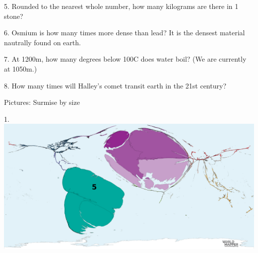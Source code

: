 \begin{frame}
\begin{center}
\Large
5. Rounded to the nearest whole number, how many kilograms are there in 1 stone?
\\
\end{center}
\end{frame}
\begin{frame}
\begin{center}
\Large
6. Osmium is how many times more dense than lead? It is the densest material nautrally found on earth.
\\
\end{center}
\end{frame}
\begin{frame}
\begin{center}
\Large
7. At 1200m, how many degrees below 100\textdegree C does water boil? (We are currently at 1050m.)
\\
\end{center}
\end{frame}
\begin{frame}
\begin{center}
\Large
8. How many times will Halley's comet transit earth in the 21st century?
\\
\end{center}
\end{frame}
\begin{frame}
\begin{center}
\Huge
Pictures: Surmise by size
\end{center}
\end{frame}
\begin{frame}
\begin{center}
\Large
1. 
\\
\vspace{0.5em}\includegraphics[height=0.6\paperheight]{maps/picture_1.png}
\\
\end{center}
\end{frame}
